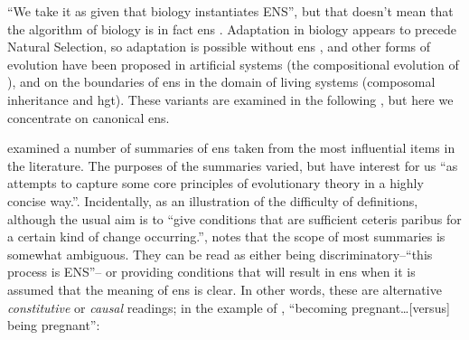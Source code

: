 ``We take it as given that biology instantiates ENS'', but that doesn't mean that the algorithm of biology is in fact \gls{ens} \parencite{Watson2012}. Adaptation in biology appears to precede Natural Selection, so adaptation is possible without \gls{ens} \parencite{Watson2010}, and other forms of evolution have been proposed in artificial systems (\eg the compositional evolution of \textcite{Arthur2009}), and on the boundaries of \gls{ens} in the domain of living systems (\eg composomal inheritance and \gls{hgt}). These variants are examined in the following , but here we concentrate on canonical \gls{ens}.

\Textcite{Godfrey-Smith2007} examined a number of summaries of \gls{ens} taken from the most influential items in the literature. The purposes of the summaries varied, but have interest for us ``as attempts to capture some core principles of evolutionary theory in a highly concise way.''. Incidentally, as an illustration of the difficulty of definitions, although the usual aim is to ``give conditions that are sufficient ceteris paribus for a certain kind of change occurring.'', \textcite{Godfrey-Smith2007} notes that the scope of most summaries is somewhat ambiguous. They can be read as either being discriminatory--``this process is ENS''-- or providing conditions that will result in \gls{ens} when it is assumed that the meaning of \gls{ens} is clear. In other words, these are alternative \emph{constitutive} or \emph{causal} readings; in the example of \textcite{Godfrey-Smith2007}, ``becoming pregnant\ldots{}{[}versus{]} being pregnant'':

